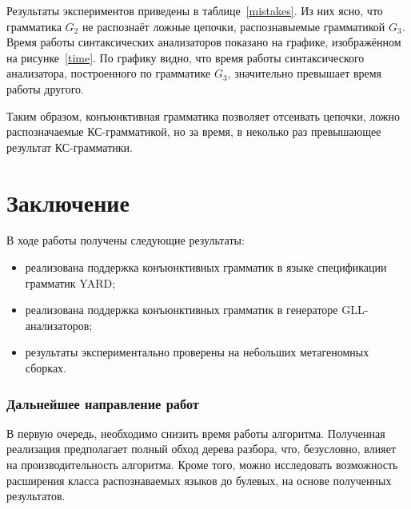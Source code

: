\documentclass[14pt]{matmex-diploma-custom}
\begin{document}
Результаты экспериментов приведены в таблице~\ref{mistakes}. Из них ясно, что грамматика $G_2$ не распознаёт ложные цепочки, распознавыемые грамматикой $G_3$. Время работы синтаксических анализаторов показано на графике, изображённом на рисунке~\ref{time}. По графику видно, что время работы синтаксического анализатора, построенного по грамматике $G_3$, значительно превышает время работы другого.

Таким образом, конъюнктивная грамматика позволяет отсеивать цепочки, ложно распозначаемые КС-грамматикой, но за время, в неколько раз превышающее результат КС-грамматики.

\section*{Заключение}
В ходе работы получены следующие результаты:
\begin{itemize}
    \item реализована поддержка конъюнктивных грамматик в языке спецификации грамматик YARD;
    \item реализована поддержка конъюнктивных грамматик в генераторе GLL-анализаторов;
    \item результаты экспериментально проверены на небольших метагеномных сборках.
\end{itemize}

\subsubsection*{Дальнейшее направление работ}

В первую очередь, необходимо снизить время работы алгоритма. Полученная реализация предполагает полный обход дерева разбора, что, безусловно, влияет на производительность алгоритма. Кроме того, можно исследовать возможность расширения класса распознаваемых языков до булевых, на основе полученных результатов.

\setmonofont[Mapping=tex-text]{CMU Typewriter Text}


\end{document}
